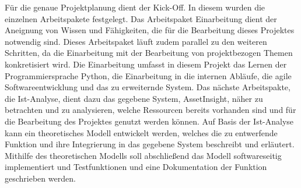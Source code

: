 Für die genaue Projektplanung dient der Kick-Off. In diesem wurden die einzelnen Arbeitspakete festgelegt. Das Arbeitspaket Einarbeitung dient der Aneignung von Wissen und Fähigkeiten,
die für die Bearbeitung dieses Projektes notwendig sind. Dieses Arbeitspaket läuft zudem parallel zu den weiteren Schritten, da die Einarbeitung mit der Bearbeitung von projektbezogen 
Themen konkretisiert wird. Die Einarbeitung umfasst in diesem Projekt das Lernen der Programmiersprache Python, die Einarbeitung in die internen Abläufe, die agile Softwareentwicklung
und das zu erweiternde System. Das nächste Arbeitspakte, die Ist-Analyse, dient dazu das gegebene System, AssetInsight, näher zu betrachten und zu analysieren, welche Ressourcen bereits 
vorhanden sind und für die Bearbeitung des Projektes genutzt werden können. Auf Basis der Ist-Analyse kann ein theoretisches Modell entwickelt werden, welches die zu entwerfende Funktion 
und ihre Integrierung in das gegebene System beschreibt und erläutert. Mithilfe des theoretischen Modells soll abschließend das Modell softwareseitig implementiert und Testfunktionen und 
eine Dokumentation der Funktion geschrieben werden.